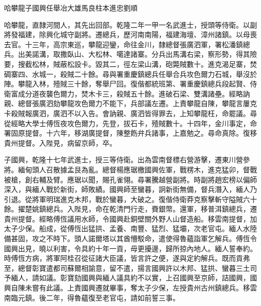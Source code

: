 
\begin{pinyinscope}
哈攀龍子國興任舉冶大雄馬良柱本進忠劉順

哈攀龍，直隸河間人，其先出回部。乾隆二年一甲一名武進士，授頭等侍衛。以副將發福建，除興化城守副將。遷總兵，歷河南南陽，福建海壇、漳州諸鎮。以母喪去官。十三年，高宗東巡，攀龍迎鑾，命往金川，隸總督張廣泗軍，署松潘鎮總兵。出美諾溝，取撒臥山、大松林、噶達諸寨。分兵出馬溝右梁，察形勢，得其險要，搜截松林，賊蔽松設卡。毀其二，徑左梁山溝，砲斃賊數十。進克渴足寨，焚碉寨四、水城一，殺賊二十餘。尋與署重慶鎮總兵任舉合兵攻色爾力石城，舉沒於陣。攀龍入林，殪賊三十餘，奪舉尸回。復偕都統班第、署重慶鎮總兵段起賢、侍衛富成分道夜襲色爾力，焚木卡三，殺賊五十餘。進破石梁、雙溝諸壘。經略訥親、總督張廣泗劾攀龍攻色爾力不能下，兵部議左遷。上責攀龍自陳，攀龍言屢克卡殺賊報廣泗，廣泗不以入告。會訥親、廣泗皆得罪去，上知攀龍枉，命罷議。尋從經略大學士傅恆夜攻色爾力，先登，拔石卡，殪賊數十。十四年，金川事定，命署固原提督。十六年，移湖廣提督，陳整飭弁兵諸事，上嘉勉之。尋命真除。復移貴州提督。入陛見，病留京師，卒。

子國興，乾隆十七年武進士，授三等侍衛。出為雲南督標右營游擊，遷東川營參將。緬甸頭人召散據孟艮為亂。總督楊應琚檄國興佐軍，戰楞木，進克猛卯，督戰被槍，創右輔及臂。應琚以聞，賜孔雀翎。尋署騰越營副將。時副將趙宏榜以偏師深入，與緬人戰於新街，師敗績。國興師至蠻暮，詗新街無備，督兵潛入，緬人乃引退。從將軍明瑞進克木邦，戰於蠻暮，大破之。復偕侍衛莽克察擊斬守隘賊六十餘。擢楚姚鎮總兵。入陛見，命在乾清門行走，賚銀幣。還軍，移普洱鎮總兵，遷貴州提督。經略傅恆議用水師，令國興赴銅壁關外野人山督造船。移雲南提督，加太子少保。船成，從傅恆出猛拱、孟養、南豐、猛烈、猛壩，次老官屯。緬人水陸備甚固，攻之不時下。頭人諾爾塔以其酋懵駁命，遣使得魯蘊詣軍乞解兵。傅恆令國興出見，曉以利害，令具約十年一貢，毋更擾邊，歸所掠內地人。緬人誓奉約。時傅恆方病，將軍阿桂召從征諸大臣議，皆言許之便，遂與定約解兵。既而貢弗至，總督彰寶遣都司蘇爾相諭意，留不遣，揚言國興許以木邦、猛拱、蠻暮三土司予緬人，請如議。彰寶劾國興與緬人議具約不以實，上召國興至京師，詰國興，國興自陳未嘗有此議。上責國興遷就畢事，奪太子少保，左授貴州古州鎮總兵。移雲南臨元鎮。後二年，得魯蘊復至老官屯，請如前誓三事。


\end{pinyinscope}
